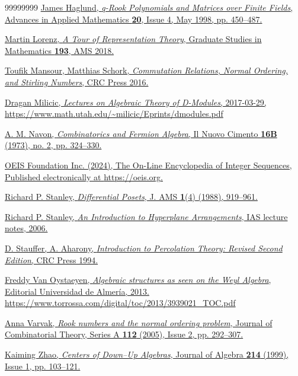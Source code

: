 \documentclass[numbers=enddot,12pt,final,onecolumn,notitlepage]{scrartcl}%
\theoremstyle{definition}
\begin{document}
\begin{thebibliography}{99999999}
\href{https://doi.org/10.1006/aama.1998.0582}{James Haglund, \textit{q-Rook Polynomials and Matrices over Finite Fields}, Advances in Applied Mathematics \textbf{20}, Issue 4, May 1998, pp. 450--487.}

\href{https://www.ams.org/books/gsm/193/}
{Martin Lorenz,
\textit{A Tour of Representation Theory},
Graduate Studies in Mathematics \textbf{193},
AMS 2018.}

\href{https://doi.org/10.1201/b18869}{Toufik Mansour, Matthias Schork, \textit{Commutation Relations, Normal Ordering, and
Stirling Numbers}, CRC Press 2016.}

\href{https://www.math.utah.edu/~milicic/Eprints/dmodules.pdf}{Dragan Milicic, \textit{Lectures on Algebraic Theory of D-Modules}, 2017-03-29,}
\url{https://www.math.utah.edu/~milicic/Eprints/dmodules.pdf}

\href{https://doi.org/10.1007/BF02828687}{A. M. Navon,
\textit{Combinatorics and Fermion Algebra},
Il Nuovo Cimento \textbf{16B} (1973), no. 2, pp. 324--330.}

\href{https://oeis.org}{OEIS Foundation Inc. (2024), The On-Line Encyclopedia of Integer Sequences, Published electronically at \url{https://oeis.org}.} 

\href{https://math.mit.edu/~rstan/pubs/pubfiles/77.pdf}{Richard P. Stanley, \emph{Differential Posets}, J. AMS \textbf{1}(4) (1988), 919--961.}

\href{https://math.mit.edu/~rstan/arrangements/arr.html}{Richard P. Stanley, \textit{An Introduction to Hyperplane
Arrangements}, IAS lecture notes, 2006.}

\href{https://doi.org/10.1201/9781315274386}
{D. Stauffer, A. Aharony, \textit{Introduction to Percolation Theory: Revised Second Edition}, CRC Press 1994.}

\href{https://www.torrossa.com/digital/toc/2013/3939021_TOC.pdf}{Freddy Van Oystaeyen,
\textit{Algebraic structures as seen on the Weyl Algebra},
Editorial Universidad de Almer\'ia, 2013.}
\url{https://www.torrossa.com/digital/toc/2013/3939021_TOC.pdf}

\href{https://doi.org/10.1016/j.jcta.2005.07.012}{Anna Varvak, \textit{Rook numbers and the normal ordering problem}, Journal of Combinatorial Theory, Series A \textbf{112} (2005), Issue 2, pp. 292--307.}

\href{https://doi.org/10.1006/jabr.1998.7695}{Kaiming Zhao, \textit{Centers of Down–Up Algebras},
Journal of Algebra \textbf{214} (1999), Issue 1, pp. 103--121.}
\end{thebibliography}
\end{document}
